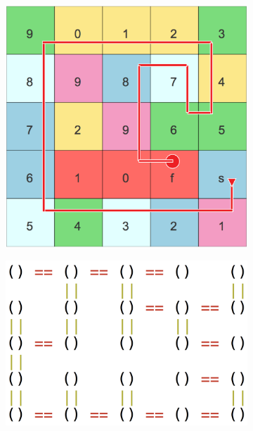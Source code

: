 \documentclass{article}
\begin{document}
	\begin{figure}[t]
\centering
\begin{subfigure}{.25\textwidth}
  \centering
  \includegraphics[width=\linewidth]{Images/cm.png}
  \caption{}
  \label{fig:cm}
\end{subfigure}%
\hspace{.083\textwidth}
\begin{subfigure}{.25\textwidth}
  \centering
  \includegraphics[width=\linewidth]{Images/pm.png}
  \caption{}
  \label{fig:pm}
\end{subfigure}

\end{figure}
\end{document}
